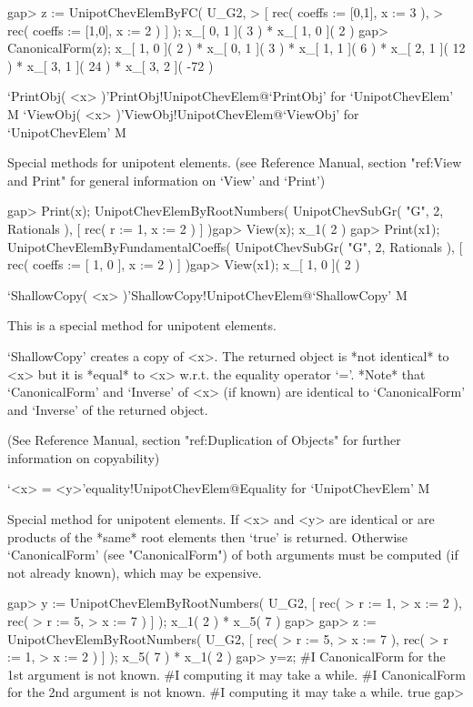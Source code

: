 \beginexample
gap> z := UnipotChevElemByFC( U_G2,
>      [ rec( coeffs := [0,1], x := 3 ),
>        rec( coeffs := [1,0], x := 2 ) ] );
x_{[ 0, 1 ]}( 3 ) * x_{[ 1, 0 ]}( 2 )
gap> CanonicalForm(z);
x_{[ 1, 0 ]}( 2 ) * x_{[ 0, 1 ]}( 3 ) * x_{[ 1, 1 ]}( 6 ) * 
x_{[ 2, 1 ]}( 12 ) * x_{[ 3, 1 ]}( 24 ) * x_{[ 3, 2 ]}( -72 ) 
\endexample


\>`PrintObj( <x> )'{PrintObj!UnipotChevElem}@{`PrintObj' for `UnipotChevElem'} M
\>`ViewObj( <x> )'{ViewObj!UnipotChevElem}@{`ViewObj' for `UnipotChevElem'} M

Special methods for unipotent elements.
(see {\GAP} Reference Manual, section "ref:View and Print" for general 
information on `View' and `Print')

\beginexample
gap> Print(x);
UnipotChevElemByRootNumbers( UnipotChevSubGr( "G", 2, Rationals ), [ rec(
      r := 1,
      x := 2 ) ] )gap> View(x);
x_{1}( 2 )
\endexample
\beginexample
gap> Print(x1);
UnipotChevElemByFundamentalCoeffs( UnipotChevSubGr( "G", 2, Rationals ),
[ rec(
      coeffs := [ 1, 0 ],
      x := 2 ) ] )gap> View(x1);
x_{[ 1, 0 ]}( 2 )
\endexample

\>`ShallowCopy( <x> )'{ShallowCopy!UnipotChevElem}@{`ShallowCopy'} M

This is a special method for unipotent elements.

`ShallowCopy' creates a copy of <x>. The returned object is *not identical*
to <x> but it is *equal* to <x> w.r.t. the equality operator `='.
*Note* that `CanonicalForm' and `Inverse' of <x> (if known) are identical
to `CanonicalForm' and `Inverse' of the returned object.

(See {\GAP} Reference Manual, section "ref:Duplication of Objects" for
further information on copyability)

\>`<x> = <y>'{equality!UnipotChevElem}@{Equality for `UnipotChevElem'} M

Special method for unipotent elements.
If <x> and <y> are identical or are products of the *same* root elements then
`true' is returned. Otherwise `CanonicalForm' (see "CanonicalForm") of
both arguments must be computed (if not already known), which may be
expensive.

\beginexample
gap> y := UnipotChevElemByRootNumbers( U_G2, [ rec(
>        r := 1,
>        x := 2 ), rec(
>        r := 5,
>        x := 7 ) ] );
x_{1}( 2 ) * x_{5}( 7 )
gap>
gap> z := UnipotChevElemByRootNumbers( U_G2, [ rec(
>        r := 5,
>        x := 7 ), rec(
>        r := 1,
>        x := 2 ) ] );
x_{5}( 7 ) * x_{1}( 2 )
gap> y=z;
#I  CanonicalForm for the 1st argument is not known.
#I                    computing it may take a while.
#I  CanonicalForm for the 2nd argument is not known.
#I                    computing it may take a while.
true
gap>


